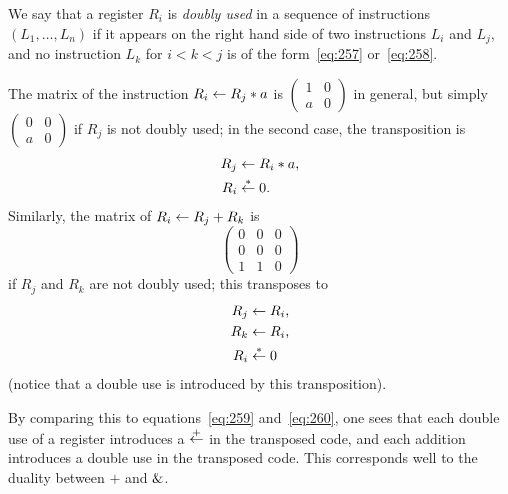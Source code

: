 \begin{definition}
  We say that a register $R_i$ is \emph{doubly used}
  in a sequence of instructions $(L_1,\ldots,L_n)$ if it appears on
  the right hand side of two instructions $L_i$ and $L_j$, and no
  instruction $L_k$ for $i<k<j$ is of the form~\eqref{eq:257}
  or~\eqref{eq:258}.
\end{definition}

The matrix of the instruction $R_i\leftarrow R_j*a$ is
$\left(\begin{smallmatrix}1&0\\a&0\end{smallmatrix}\right)$ in
general, but simply
$\left(\begin{smallmatrix}0&0\\a&0\end{smallmatrix}\right)$ if $R_j$
is not doubly used; in the second case, the transposition is
\begin{equation}
  \label{eq:262}
  \begin{aligned}
    R_j&\leftarrow R_i*a\text{,}\\
    R_i&\overset{*}{\leftarrow} 0\text{.}
  \end{aligned}
\end{equation}
Similarly, the matrix of $R_i\leftarrow R_j+R_k$ is 
\begin{equation}
  \label{eq:265}
  \begin{pmatrix}
    0 & 0 & 0\\
    0 & 0 & 0\\
    1 & 1 & 0
  \end{pmatrix}
\end{equation}
if $R_j$ and $R_k$ are not doubly used; this transposes to
\begin{equation}
  \label{eq:263}
  \begin{aligned}
    R_j &\leftarrow R_i\text{,}\\
    R_k &\leftarrow R_i\text{,}\\
    R_i &\overset{*}{\leftarrow} 0
  \end{aligned}
\end{equation}
(notice that a double use is introduced by this transposition).

By comparing this to equations~\eqref{eq:259} and~\eqref{eq:260}, one
sees that each double use of a register introduces a
$\overset{+}{\leftarrow}$ in the transposed code, and each addition
introduces a double use in the transposed code. This corresponds well
to the duality between $+$ and $\operatorname{\&}$.

